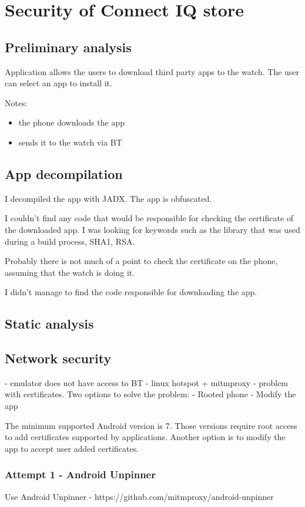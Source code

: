 \section{Security of Connect IQ store}
\subsection{Preliminary analysis}
Application allows the users to download third party apps to the watch.
The user can select an app to install it.

Notes:
\begin{itemize}
    \item the phone downloads the app
    \item sends it to the watch via BT
\end{itemize}

\subsection{App decompilation}
I decompiled the app with JADX. The app is obfuscated.

I couldn't find any code that would be responsible for checking the certificate of the downloaded app.
I was looking for keywords such as the library that was used during a build process, SHA1, RSA\@.

Probably there is not much of a point to check the certificate on the phone, assuming that the watch is doing it.

I didn't manage to find the code responsible for downloading the app.
\subsection{Static analysis}

\subsection{Network security}
- emulator does not have access to BT
- linux hotspot + mitmproxy - problem with certificates.
Two options to solve the problem:
- Rooted phone
- Modify the app

The minimum supported Android version is 7.
Those versions require root access to add certificates supported by applications.
Another option is to modify the app to accept user added certificates.

\subsubsection{Attempt 1 - Android Unpinner}
Use Android Unpinner - https://github.com/mitmproxy/android-unpinner

